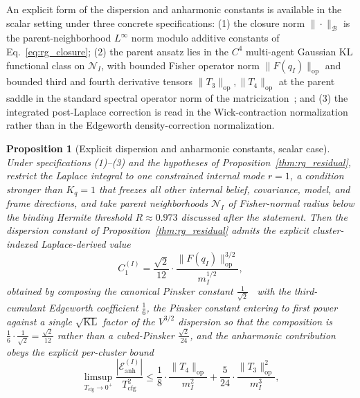 \documentclass[11pt]{article}
\newtheorem{proposition}{Proposition}
\begin{document}
An explicit form of the dispersion and anharmonic constants is available in the scalar setting under three concrete specifications: (1) the closure norm $\|\cdot\|_\mathcal{B}$ is the parent-neighborhood $L^\infty$ norm modulo additive constants of Eq.~\eqref{eq:rg_closure}; (2) the parent ansatz lies in the $C^4$ multi-agent Gaussian KL functional class on $\mathcal{N}_I$, with bounded Fisher operator norm $\|F(q_I)\|_{\mathrm{op}}$ and bounded third and fourth derivative tensors $\|T_3\|_{\mathrm{op}}, \|T_4\|_{\mathrm{op}}$ at the parent saddle in the standard spectral operator norm of the matricization~\cite{HornJohnson2013}; and (3) the integrated post-Laplace correction is read in the Wick-contraction normalization rather than in the Edgeworth density-correction normalization.

\begin{proposition}[Explicit dispersion and anharmonic constants, scalar case]
\label{thm:rg_residual_explicit}
Under specifications (1)--(3) and the hypotheses of Proposition~\ref{thm:rg_residual}, restrict the Laplace integral to one constrained internal mode $r=1$, a condition stronger than $K_q=1$ that freezes all other internal belief, covariance, model, and frame directions, and take parent neighborhoods $\mathcal{N}_I$ of Fisher-normal radius below the binding Hermite threshold $R \approx 0.973$ discussed after the statement. Then the dispersion constant of Proposition~\ref{thm:rg_residual} admits the explicit cluster-indexed Laplace-derived value
\begin{equation}
C_1^{(I)} = \frac{\sqrt 2}{12} \cdot \frac{\|F(q_I)\|_{\mathrm{op}}^{3/2}}{m_I^{1/2}},
\label{eq:rg_C1_explicit}
\end{equation}
obtained by composing the canonical Pinsker constant $\tfrac{1}{\sqrt 2}$~\cite{CoverThomas2006} with the third-cumulant Edgeworth coefficient $\tfrac{1}{6}$, the Pinsker constant entering to first power against a single $\sqrt{\mathrm{KL}}$ factor of the $V^{3/2}$ dispersion so that the composition is $\tfrac{1}{6}\cdot\tfrac{1}{\sqrt 2} = \tfrac{\sqrt 2}{12}$ rather than a cubed-Pinsker $\tfrac{\sqrt 2}{24}$, and the anharmonic contribution obeys the explicit per-cluster bound
\begin{equation}
\limsup_{T_{\mathrm{cfg}}\to0^+}\frac{|\mathcal{E}_{\mathrm{anh}}^{(I)}|}{T_{\mathrm{cfg}}^2} \leq \frac{1}{8} \cdot \frac{\|T_4\|_{\mathrm{op}}}{m_I^2} + \frac{5}{24} \cdot \frac{\|T_3\|_{\mathrm{op}}^2}{m_I^3},
\label{eq:rg_C5_explicit}
\end{equation}

\end{proposition}
\end{document}
